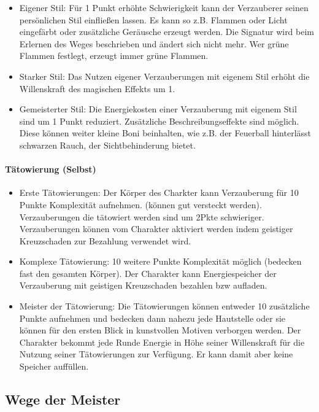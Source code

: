 \documentclass{article}
\begin{document}
\begin{itemize}
\item Eigener Stil: Für 1 Punkt erhöhte Schwierigkeit kann der Verzauberer seinen persönlichen Stil einfließen lassen. Es kann so z.B. Flammen oder Licht eingefärbt oder zusätzliche Geräusche erzeugt werden. Die Signatur wird beim Erlernen des Weges beschrieben und ändert sich nicht mehr. Wer grüne Flammen festlegt, erzeugt immer grüne Flammen.
\item Starker Stil: Das Nutzen eigener Verzauberungen mit eigenem Stil erhöht die Willenskraft des magischen Effekts um 1.
\item Gemeisterter Stil: Die Energiekosten einer Verzauberung mit eigenem Stil sind um 1 Punkt reduziert. Zusätzliche Beschreibungseffekte sind möglich. Diese können weiter kleine Boni beinhalten, wie z.B. der Feuerball hinterlässt schwarzen Rauch, der Sichtbehinderung bietet.
\end{itemize}

\paragraph{Tätowierung (Selbst)}

\begin{itemize}
\item Erste Tätowierungen: Der Körper des Charkter kann Verzauberung für 10 Punkte Komplexität aufnehmen. (können gut versteckt werden). Verzauberungen die tätowiert werden sind um 2Pkte schwieriger. Verzauberungen können vom Charakter aktiviert werden indem geistiger Kreuzschaden zur Bezahlung verwendet wird.
\item Komplexe Tätowierung: 10 weitere Punkte Komplexität möglich (bedecken fast den gesamten Körper). Der Charakter kann Energiespeicher der Verzauberung mit geistigen Kreuzschaden bezahlen bzw aufladen.
\item Meister der Tätowierung: Die Tätowierungen können entweder 10 zusätzliche Punkte aufnehmen und bedecken dann nahezu jede Hautstelle oder sie können für den ersten Blick in kunstvollen Motiven verborgen werden. Der Charakter bekommt jede Runde Energie in Höhe seiner Willenskraft für die Nutzung seiner Tätowierungen zur Verfügung. Er kann damit aber keine Speicher auffüllen.
\end{itemize}

\begin{center}
\section{Wege der Meister}
\end{center}
\end{document}
